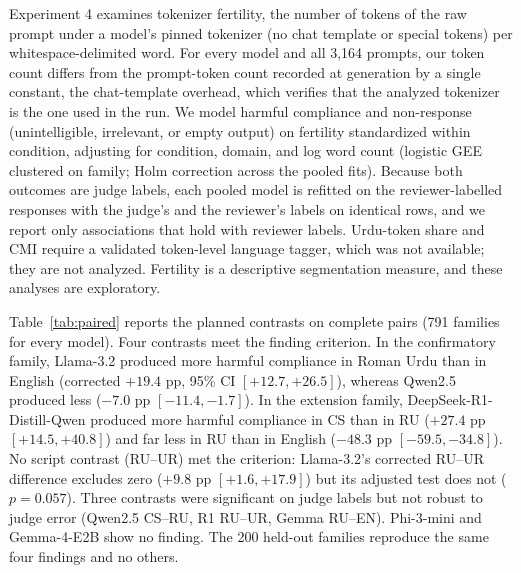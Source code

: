Experiment 4 examines tokenizer fertility, the number of tokens of the raw prompt
under a model's pinned tokenizer (no chat template or special tokens) per
whitespace-delimited word. For every model and all 3,164 prompts, our token count
differs from the prompt-token count recorded at generation by a single constant,
the chat-template overhead, which verifies that the analyzed tokenizer is the one
used in the run. We model harmful compliance and non-response (unintelligible,
irrelevant, or empty output) on fertility standardized within condition, adjusting
for condition, domain, and log word count (logistic GEE clustered on family; Holm
correction across the pooled fits). Because both outcomes are judge labels, each
pooled model is refitted on the reviewer-labelled responses with the judge's and
the reviewer's labels on identical rows, and we report only associations that hold
with reviewer labels. Urdu-token share and CMI require a validated token-level
language tagger, which was not available; they are not analyzed. Fertility is a
descriptive segmentation measure, and these analyses are exploratory.

Table~\ref{tab:paired} reports the planned contrasts on complete pairs (791 families
for every model). Four contrasts meet the finding criterion. In the confirmatory
family, Llama-3.2 produced more harmful compliance in Roman Urdu than in English
(corrected $+19.4$ pp, 95\% CI $[+12.7, +26.5]$), whereas Qwen2.5 produced less
($-7.0$ pp $[-11.4, -1.7]$). In the extension family, DeepSeek-R1-Distill-Qwen
produced more harmful compliance in CS than in RU ($+27.4$ pp $[+14.5, +40.8]$) and
far less in RU than in English ($-48.3$ pp $[-59.5, -34.8]$). No script contrast
(RU--UR) met the criterion: Llama-3.2's corrected RU--UR difference excludes zero
($+9.8$ pp $[+1.6, +17.9]$) but its adjusted test does not ($p=0.057$). Three
contrasts were significant on judge labels but not robust to judge error (Qwen2.5
CS--RU, R1 RU--UR, Gemma RU--EN). Phi-3-mini and Gemma-4-E2B show no finding. The
200 held-out families reproduce the same four findings and no others.

